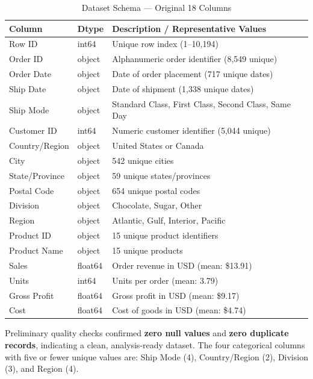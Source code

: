 \documentclass[12pt, a4paper]{article}
\begin{document}
\begin{table}[H]
\centering
\caption{Dataset Schema --- Original 18 Columns}
\label{tab:schema}
\renewcommand{\arraystretch}{1.15}
\begin{tabularx}{\textwidth}{llX}
\toprule
\textbf{Column} & \textbf{Dtype} & \textbf{Description / Representative Values} \\
\midrule
Row ID          & int64   & Unique row index (1--10,194) \\
Order ID        & object  & Alphanumeric order identifier (8,549 unique) \\
Order Date      & object  & Date of order placement (717 unique dates) \\
Ship Date       & object  & Date of shipment (1,338 unique dates) \\
Ship Mode       & object  & Standard Class, First Class, Second Class, Same Day \\
Customer ID     & int64   & Numeric customer identifier (5,044 unique) \\
Country/Region  & object  & United States or Canada \\
City            & object  & 542 unique cities \\
State/Province  & object  & 59 unique states/provinces \\
Postal Code     & object  & 654 unique postal codes \\
Division        & object  & Chocolate, Sugar, Other \\
Region          & object  & Atlantic, Gulf, Interior, Pacific \\
Product ID      & object  & 15 unique product identifiers \\
Product Name    & object  & 15 unique products \\
Sales           & float64 & Order revenue in USD (mean: \$13.91) \\
Units           & int64   & Units per order (mean: 3.79) \\
Gross Profit    & float64 & Gross profit in USD (mean: \$9.17) \\
Cost            & float64 & Cost of goods in USD (mean: \$4.74) \\
\bottomrule
\end{tabularx}
\end{table}

Preliminary quality checks confirmed \textbf{zero null values} and
\textbf{zero duplicate records}, indicating a clean, analysis-ready dataset.
The four categorical columns with five or fewer unique values are:
Ship Mode (4), Country/Region (2), Division (3), and Region (4).
\end{document}
